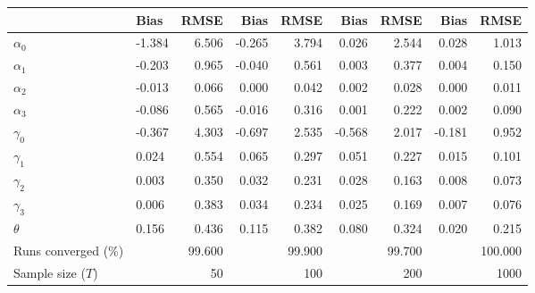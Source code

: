 
\begin{tabular}[t]{llrrrrrrr}
\toprule
  & Bias & RMSE & Bias & RMSE & Bias & RMSE & Bias & RMSE\\
\midrule
$\alpha_{0}$ & -1.384 & 6.506 & -0.265 & 3.794 & 0.026 & 2.544 & 0.028 & 1.013\\
$\alpha_{1}$ & -0.203 & 0.965 & -0.040 & 0.561 & 0.003 & 0.377 & 0.004 & 0.150\\
$\alpha_{2}$ & -0.013 & 0.066 & 0.000 & 0.042 & 0.002 & 0.028 & 0.000 & 0.011\\
$\alpha_{3}$ & -0.086 & 0.565 & -0.016 & 0.316 & 0.001 & 0.222 & 0.002 & 0.090\\
$\gamma_{0}$ & -0.367 & 4.303 & -0.697 & 2.535 & -0.568 & 2.017 & -0.181 & 0.952\\
$\gamma_{1}$ & 0.024 & 0.554 & 0.065 & 0.297 & 0.051 & 0.227 & 0.015 & 0.101\\
$\gamma_{2}$ & 0.003 & 0.350 & 0.032 & 0.231 & 0.028 & 0.163 & 0.008 & 0.073\\
$\gamma_{3}$ & 0.006 & 0.383 & 0.034 & 0.234 & 0.025 & 0.169 & 0.007 & 0.076\\
$\theta$ & 0.156 & 0.436 & 0.115 & 0.382 & 0.080 & 0.324 & 0.020 & 0.215\\
Runs converged (\%) &  & 99.600 &  & 99.900 &  & 99.700 &  & 100.000\\
Sample size ($T$) &  & 50 &  & 100 &  & 200 &  & 1000\\
\bottomrule
\end{tabular}
